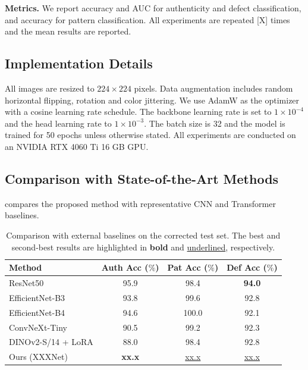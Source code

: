 \documentclass[preprint,12pt,a4paper]{elsarticle}
\begin{document}
\textbf{Metrics.}
We report accuracy and AUC for authenticity and defect classification, and accuracy for pattern classification.
All experiments are repeated [X] times and the mean results are reported.

\subsection{Implementation Details}

All images are resized to $224 \times 224$ pixels.
Data augmentation includes random horizontal flipping, rotation and color jittering.
We use AdamW as the optimizer with a cosine learning rate schedule.
The backbone learning rate is set to $1 \times 10^{-4}$ and the head learning rate to $1 \times 10^{-3}$.
The batch size is 32 and the model is trained for 50 epochs unless otherwise stated.
All experiments are conducted on an NVIDIA RTX 4060 Ti 16 GB GPU.

\subsection{Comparison with State-of-the-Art Methods}

 compares the proposed method with representative CNN and Transformer baselines.

\begin{table}[htbp]
    \centering
    \caption{Comparison with external baselines on the corrected test set. The best and second-best results are highlighted in \textbf{bold} and \underline{underlined}, respectively.}
    \label{tab:main-result}
    \begin{tabular}{lccc}
        \toprule
        Method & Auth Acc ($\%$) & Pat Acc ($\%$) & Def Acc ($\%$) \\
        \midrule
        ResNet50 & 95.9 & 98.4 & \textbf{94.0} \\
        EfficientNet-B3 & 93.8 & 99.6 & 92.8 \\
        EfficientNet-B4 & 94.6 & 100.0 & 92.1 \\
        ConvNeXt-Tiny & 90.5 & 99.2 & 92.3 \\
        DINOv2-S/14 + LoRA & 88.0 & 98.4 & 92.8 \\
        \midrule
        Ours (XXXNet) & \textbf{xx.x} & \underline{xx.x} & \underline{xx.x} \\
        \bottomrule
    \end{tabular}
\end{table}
\end{document}

